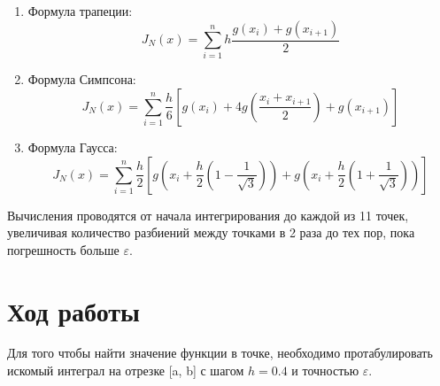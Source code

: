 \documentclass[a4paper,12pt]{article}
\begin{document}
{\begin{enumerate}
{\begin{enumerate}
{                }
            \item {
                Формула трапеции:
                \begin{equation}
                    J_N(x) = \displaystyle\sum_{i=1}^{n}h \displaystyle\frac{g(x_i)+g(x_{i+1})}{2}
                \end{equation}
                }
            \item {
                Формула Симпсона:
                \begin{equation}
                    J_N(x) = \displaystyle\sum_{i=1}^{n}\displaystyle\frac{h}{6} \left[g(x_i)+4g\left(
                        \displaystyle\frac{x_i + x_{i+1}}{2}
                    \right) + g(x_{i+1}) \right]
                \end{equation}
                }
            \item {
                Формула Гаусса:
                \begin{equation}
                    J_N(x) = \displaystyle\sum_{i=1}^{n}\displaystyle\frac{h}{2} \left[g\left(
                        x_i + \displaystyle\frac{h}{2}\left(1 - \displaystyle\frac{1}{\sqrt{3}} \right)
                    \right) +
                    g\left(
                        x_i + \displaystyle\frac{h}{2}\left(1 + \displaystyle\frac{1}{\sqrt{3}} \right)
                    \right)
                    \right]
                \end{equation}
                }
        \end{enumerate}
    }
\end{enumerate}

Вычисления проводятся от начала интегрирования до каждой из 11 точек, увели\-чивая количество разбиений между точками в 2 раза до тех пор, пока погрешность больше $\varepsilon$.
\newpage
\section{Ход работы}
\hspace*{1.25cm}Для того чтобы найти значение функции в точке, необходимо протабулировать искомый интеграл на отрезке [a, b] с шагом $h = 0.4$ и точностью $\varepsilon$. 

}
\end{document}
